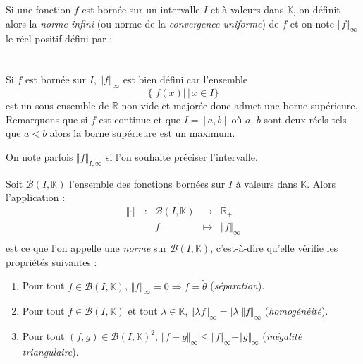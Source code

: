 \documentclass[a4paper,10pt]{report}
\begin{document}


\begin{defin} Si une fonction $f$ est bornée sur un intervalle $I$ et à valeurs dans $\mathbb{K}$, on définit alors la \textit{norme infini} (ou norme de la \textit{convergence uniforme}) de $f$ et on note $\Vert f \Vert_{\infty}$ le réel positif défini par :
$$ \phantom{\Vert f \Vert_{\infty} = \sup_{x \in I} \vert f(x) \vert} $$
\end{defin}

\begin{rems} 
\item Si $f$ est bornée sur $I$, $\Vert f \Vert_{\infty}$ est bien défini car l'ensemble 
$$ \lbrace \vert f(x) \vert \, \vert \, x \in I \rbrace$$
est un sous-ensemble de $\mathbb{R}$ non vide et majorée donc admet une borne supérieure. Remarquons que si $f$ est continue et que $I= [a,b]$ où $a$, $b$ sont deux réels tels que $a<b$ alors la borne supérieure est un maximum.
\item On note parfois $\Vert f \Vert_{I,\infty}$ si l'on souhaite préciser l'intervalle.
\end{rems} 

\begin{thm} Soit $\mathcal{B}(I,\mathbb{K})$ l'ensemble des fonctions bornées sur $I$ à valeurs dans $\mathbb{K}$. Alors l'application :
$$ \begin{array}{ccccl}
\Vert \cdot \Vert & : & \mathcal{B}(I, \mathbb{K}) & \rightarrow & \mathbb{R}_+ \\
& & f & \mapsto & \Vert f \Vert_{\infty} \\
\end{array}$$
est ce que l'on appelle une \textit{norme} sur $\mathcal{B}(I,\mathbb{K})$, c'est-à-dire qu'elle vérifie les propriétés suivantes : 
\begin{enumerate}
\item Pour tout $f \in \mathcal{B}(I,\mathbb{K})$, $\Vert f \Vert_{\infty} = 0 \Longrightarrow f= \tilde{\theta}$ (\textit{séparation}).
\item Pour tout $f  \in \mathcal{B}(I,\mathbb{K})$ et tout $\lambda \in \mathbb{K}$, $\Vert \lambda f \Vert_{\infty} = \vert \lambda \vert \Vert f \Vert_{\infty}$ (\textit{homogénéité}).
\item Pour tout $(f,g) \in \mathcal{B}(I,\mathbb{K})^2$, $\Vert f+g \Vert_{\infty} \leq \Vert f\Vert_{\infty} + \Vert g \Vert_{\infty}$ (\textit{inégalité triangulaire}).
\end{enumerate}
\end{thm}
\begin{preuve}

\vspace{10cm}

\newpage

$\phantom{test}$

\vspace{9cm}
\end{preuve}
\end{document}
